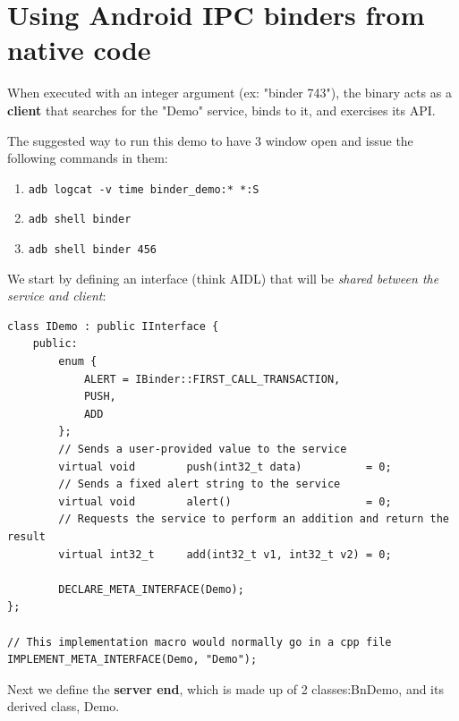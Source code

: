\documentclass[11pt, a4paper]{book}
\begin{document}
\section{Using Android IPC binders from native code}
When executed with an integer argument (ex: "binder 743"), the binary acts as a
\textbf{client} that searches for the "Demo" service, binds to it, and exercises
its API.

The suggested way to run this demo to have 3 window open and issue the following
commands in them:
\begin{enumerate}
    \item \verb|adb logcat -v time binder_demo:* *:S|
    \item \verb|adb shell binder|
    \item \verb|adb shell binder 456|
\end{enumerate}

We start by defining an interface (think AIDL) that will be \emph{shared between the
service and client}:
\begin{verbatim}
class IDemo : public IInterface {
    public:
        enum {
            ALERT = IBinder::FIRST_CALL_TRANSACTION,
            PUSH,
            ADD
        };
        // Sends a user-provided value to the service
        virtual void        push(int32_t data)          = 0;
        // Sends a fixed alert string to the service
        virtual void        alert()                     = 0;
        // Requests the service to perform an addition and return the result
        virtual int32_t     add(int32_t v1, int32_t v2) = 0;
 
        DECLARE_META_INTERFACE(Demo);
};
 
// This implementation macro would normally go in a cpp file
IMPLEMENT_META_INTERFACE(Demo, "Demo");
\end{verbatim}

Next we define the \textbf{server end}, which is made up of 2 classes:BnDemo,
and its derived class, Demo.
\end{document}
